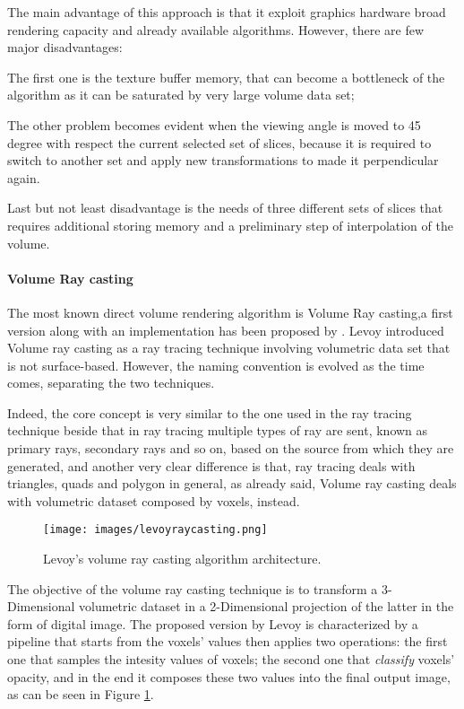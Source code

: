 \documentclass[12pt,a4paper]{extarticle}
\newcommand{\linespace}{\vspace{8pt}}
\begin{document}
The main advantage of this approach is that it exploit graphics hardware broad rendering capacity and already available algorithms. However, there are few major disadvantages: 

The first one is the texture buffer memory, that can become a bottleneck of the algorithm as it can be saturated by very large volume data set; 

The other problem becomes evident when the viewing angle is moved to 45 degree with respect the current selected set of slices, because it is required to switch to another set and apply new transformations to made it perpendicular again.


Last but not least disadvantage is the needs of three different sets of slices that requires additional storing memory and a preliminary step of interpolation of the volume.

\paragraph{Volume Ray casting}
The most known direct volume rendering algorithm is Volume Ray casting,a first version along with an implementation has been proposed by \cite{levoy_1990:5}.
Levoy introduced Volume ray casting as a ray tracing technique involving volumetric data set that is not surface-based. However, the naming convention is evolved as the time comes, separating the two techniques.
\linespace

Indeed, the core concept is very similar to the one used in the ray tracing technique beside that in ray tracing multiple types of ray are sent, known as primary rays, secondary rays and so on, based on the source from which they are generated, and another very clear difference is that, ray tracing deals with triangles, quads and polygon in general, as already said, Volume ray casting deals with volumetric dataset composed by voxels, instead.


\begin{figure}[hbtp]
\centering
\texttt{[image: images/levoyraycasting.png]}
\caption{Levoy's volume ray casting algorithm architecture.}
\label{fig:levoyraycasting}
\end{figure}

The objective of the volume ray casting technique is to transform a 3-Dimensional volumetric dataset in a 2-Dimensional projection of the latter in the form of digital image. The proposed version by Levoy is characterized by a pipeline that starts from the voxels' values then applies two operations: the first one that samples the intesity values of voxels; the second one that \textit{classify} voxels' opacity, and in the end it composes these two values into the final output image, as can be seen in Figure \ref{fig:levoyraycasting}.
\linespace
\end{document}
